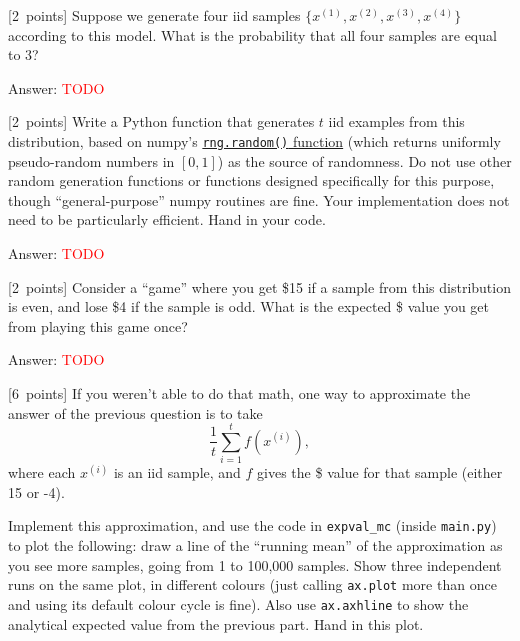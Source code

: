 \documentclass{article}
\newcommand{\ask}[1]{\textcolor{question}{#1}}
\newenvironment{answer}{\par\begingroup\color{answer}Answer: }{\endgroup}
\newcommand{\red}[1]{\textcolor{red}{#1}}
\newcommand{\pts}[1]{\textcolor{points}{[#1~points]}}
\newcommand{\TODO}{\red{TODO}}
\newcommand{\toth}[1]{^{(#1)}}
\newcommand{\ith}{\toth{i}}
\numberwithin{equation}{section}
\begin{document}
\begin{qlist}

\item \pts{2}
    Suppose we generate four iid samples $\{x\toth{1},x\toth{2},x\toth{3},x\toth{4}\}$ according to this model.
    \ask{What is the probability that all four samples are equal to 3?}

\begin{answer}\TODO\end{answer}



\item \pts{2}
    Write a Python function that generates $t$ iid examples from this distribution,
    based on numpy's \href{https://numpy.org/doc/stable/reference/random/generated/numpy.random.Generator.random.html#numpy.random.Generator.random}{\texttt{rng.random()} function} (which returns uniformly pseudo-random numbers in $[0, 1]$) as the source of randomness.
    Do not use other random generation functions or functions designed specifically for this purpose,
    though ``general-purpose'' numpy routines are fine.
    Your implementation does not need to be particularly efficient.
    \ask{Hand in your code.}
\begin{answer}\TODO\end{answer}


\item \pts{2}
    Consider a ``game'' where you get \$15 if a sample from this distribution is even, and lose \$4 if the sample is odd.
    \ask{What is the expected \$ value you get from playing this game once?}
\begin{answer}\TODO\end{answer}

\item \pts{6}
    If you weren't able to do that math, one way to approximate the answer of the previous question is to take
    \[ \frac 1 t \sum_{i=1}^t f(x\ith), \]
    where each $x\ith$ is an iid sample, and $f$ gives the \$ value for that sample (either 15 or -4).

    Implement this approximation, and use the code in \texttt{expval\_mc} (inside \texttt{main.py}) to plot the following:
    draw a line of the ``running mean'' of the approximation as you see more samples,
    going from 1 to 100,000 samples.
    Show three independent runs on the same plot, in different colours
    (just calling \texttt{ax.plot} more than once and using its default colour cycle is fine).
    Also use \texttt{ax.axhline} to show the analytical expected value from the previous part.
    \ask{Hand in this plot.}


\end{qlist}
\end{document}
